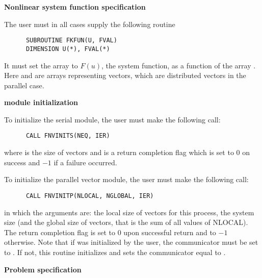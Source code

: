 \begin{Steps}
  
\item {\bf Nonlinear system function specification}
  
  The user must in all cases supply the following {\F} routine
\begin{verbatim}
      SUBROUTINE FKFUN(U, FVAL)
      DIMENSION U(*), FVAL(*)
\end{verbatim}
  It must set the  array to $F(u)$, the system function, as a
  function of the array . Here  and  are arrays representing
  vectors, which are distributed vectors in the parallel case.

\item  {\bf {\nvector} module initialization}

  {\s} To initialize the serial {\nvector} module, the user must make the
  following call:
\begin{verbatim}
      CALL FNVINITS(NEQ, IER)
\end{verbatim}
  where  is the size of vectors and
   is a return completion flag which is set to $0$ on success and $-1$ 
  if a failure occurred.
  
  {\p} To initialize the parallel vector module, the user must make the
  following call:
\begin{verbatim}
      CALL FNVINITP(NLOCAL, NGLOBAL, IER)
\end{verbatim}
  in which the arguments are:  the local size of vectors for this
  process,  the system size (and the global size of vectors, that
  is the sum of all values of NLOCAL). The return completion flag  is
  set to $0$ upon successful return and to $-1$ otherwise.
  Note that if {\mpi} was initialized by the user, the communicator must be
  set to .  If not, this routine initializes {\mpi} and sets
  the communicator equal to .

\item {\bf Problem specification}


\end{Steps}
